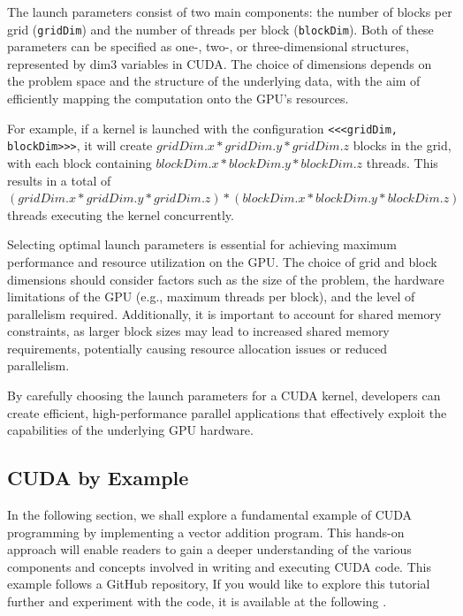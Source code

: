 The launch parameters consist of two main components: the number of blocks per grid (\texttt{gridDim}) and the 
number of threads per block (\texttt{blockDim}). Both of these parameters can be specified as one-, two-, or 
three-dimensional structures, represented by dim3 variables in CUDA. The choice of dimensions depends 
on the problem space and the structure of the underlying data, with the aim of efficiently mapping the 
computation onto the GPU's resources.

For example, if a kernel is launched with the configuration \texttt{<<<gridDim, blockDim>>>}, it will create 
$gridDim.x * gridDim.y * gridDim.z$ blocks in the grid, with each block 
containing $blockDim.x * blockDim.y * blockDim.z$ threads. This results in a total of 
$(gridDim.x * gridDim.y * gridDim.z) * (blockDim.x * blockDim.y * blockDim.z)$ threads executing the 
kernel concurrently.

Selecting optimal launch parameters is essential for achieving maximum performance and resource 
utilization on the GPU\cite{cuda2019guide}. The choice of grid and block dimensions should consider factors such as the 
size of the problem, the hardware limitations of the GPU (e.g., maximum threads per block), and the 
level of parallelism required. Additionally, it is important to account for shared memory constraints, 
as larger block sizes may lead to increased shared memory requirements, potentially causing resource 
allocation issues or reduced parallelism\cite{cuda2019guide}.

By carefully choosing the launch parameters for a CUDA kernel, developers can create efficient, 
high-performance parallel applications that effectively exploit the capabilities of the underlying GPU hardware.\cite{cuda2019guide}

\subsection{CUDA by Example}
\label{sec:cudabyexample}

In the following section, we shall explore a fundamental example of CUDA programming by implementing a vector 
addition program. This hands-on approach will enable readers to gain a deeper understanding of the various components 
and concepts involved in writing and executing CUDA code. This example follows a GitHub repository, If you would like 
to explore this tutorial further and experiment with the code, it is available at the following \cite{Papatheodore2022}.

